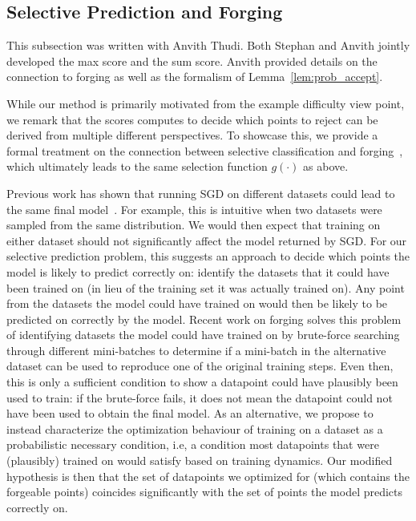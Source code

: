 \subsection{Selective Prediction and Forging}
\label{sec:forging}

\begin{contriback}
This subsection was written with Anvith Thudi. Both Stephan and Anvith jointly developed the max score and the sum score. Anvith provided details on the connection to forging as well as the formalism of Lemma~\ref{lem:prob_accept}.
\end{contriback}

While our \sptd method is primarily motivated from the example difficulty view point, we remark that the scores \sptd computes to decide which points to reject can be derived from multiple different perspectives. To showcase this, we provide a formal treatment on the connection between selective classification and forging~\citep{thudi2022necessity}, which ultimately leads to the same selection function $g(\cdot)$ as above.

Previous work has shown that running SGD on different datasets could lead to the same final model~\citep{hardt2016train,bassily2020stability,thudi2022necessity}. For example, this is intuitive when two datasets were sampled from the same distribution. We would then expect that training on either dataset should not significantly affect the model returned by SGD. For our selective prediction problem, this suggests an approach to decide which points the model is likely to predict correctly on: identify the datasets that it could have been trained on (in lieu of the training set it was actually trained on). Any point from the datasets the model could have trained on would then be likely to be predicted on correctly by the model. %
Recent work on forging \cite{thudi2022necessity} solves this problem of identifying datasets the model could have trained on by brute-force searching through different mini-batches to determine if a mini-batch in the alternative dataset can be used to reproduce one of the original training steps. Even then, this is only a sufficient condition to show a datapoint could have plausibly been used to train: if the brute-force fails, it does not mean the datapoint could not have been used to obtain the final model. As an alternative, we propose to instead characterize the optimization behaviour of training on a dataset as a probabilistic necessary condition, i.e, a condition most datapoints that were (plausibly) trained on would satisfy based on training dynamics. Our modified hypothesis is then that the set of datapoints we optimized for (which contains the forgeable points) coincides significantly with the set of points the model predicts correctly on.


